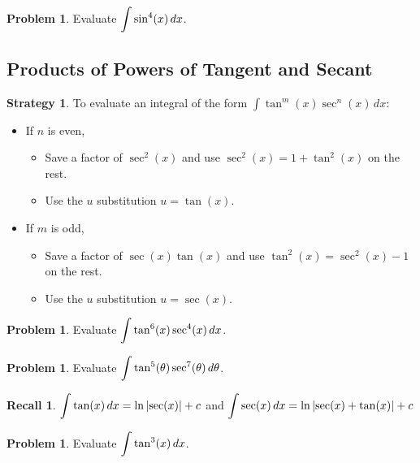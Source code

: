 \documentclass[letterpaper, twoside, 12pt]{book}
\theoremstyle{definition}
\newtheorem{recall}[theorem]{Recall}
\theoremstyle{definition}
\newtheorem{problem}[theorem]{Problem}
\newtheorem{strategy}[theorem]{Strategy}
\newcommand{\ds}{\ensuremath{\displaystyle}}
\begin{document}
\vfill

\begin{problem}
 Evaluate $\ds \int \sin^4(x) \, dx$.
\end{problem}

\vfill

\subsection{Products of Powers of Tangent and Secant}

\begin{strategy}
 To evaluate an integral of the form $\int \tan^m(x)\sec^n(x) \, dx$:
 \begin{itemize}
  \item If $n$ is even,
  \begin{itemize}
    \item Save a factor of $\sec^2(x)$ and use $\sec^2(x) = 1+ \tan^2(x)$
          on the rest.
    \item Use the $u$ substitution $u = \tan(x)$.
  \end{itemize}
  \item If $m$ is odd,
  \begin{itemize}
    \item Save a factor of $\sec(x)\tan(x)$ and use $\tan^2(x) = \sec^2(x) -1$
          on the rest.
    \item Use the $u$ substitution $u = \sec(x)$.
  \end{itemize}
 \end{itemize}
\end{strategy}

\begin{problem}
 Evaluate $\ds \int \tan^6(x)\sec^4(x) \, dx$.
\end{problem}

\vfill

\newpage

\begin{problem}
 Evaluate $\ds \int \tan^5(\theta)\sec^7(\theta) \, d\theta$.
\end{problem}

\vfill

\begin{recall}
 $\ds \int \tan(x) \, dx = \ln\left|\sec(x)\right| + c$ and $\ds \int \sec(x) \, dx = \ln\left|\sec(x) + \tan(x)\right|+c$
\end{recall}

\begin{problem}
 Evaluate $\ds \int \tan^3(x) \, dx$.
\end{problem}
\end{document}
